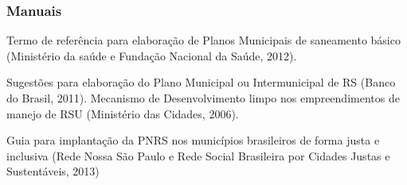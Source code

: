 \begin{subapend}
\begin{subsubapend}
		\subsubsection{Manuais}
		Termo de referência para elaboração de Planos Municipais de saneamento básico (Ministério da saúde e Fundação Nacional da Saúde, 2012).
		
		Sugestões para elaboração do Plano Municipal ou Intermunicipal de RS (Banco do Brasil, 2011).
		Mecanismo de Desenvolvimento limpo nos empreendimentos de manejo de RSU (Ministério das Cidades, 2006).
		
		Guia para implantação da PNRS nos municípios brasileiros de forma justa e inclusiva (Rede Nossa São Paulo e Rede Social Brasileira por Cidades Justas e Sustentáveis, 2013)
	\end{subsubapend}
\end{subapend}

